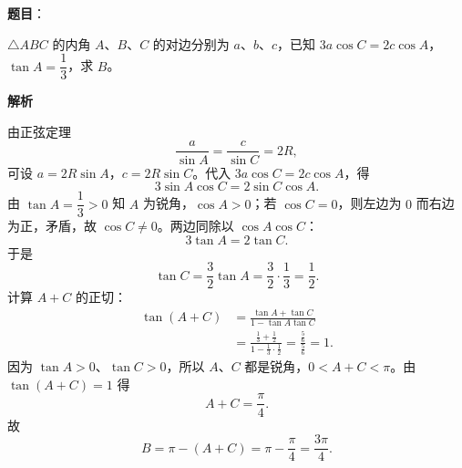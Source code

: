 \begin{answer}

\textbf{题目}：

$\triangle ABC$ 的内角 $A$、$B$、$C$ 的对边分别为 $a$、$b$、$c$，已知 $3a\cos C=2c\cos A$，$\tan A=\dfrac13$，求 $B$。

\textbf{解析}

由正弦定理
\nopagebreak[4]
\[\frac{a}{\sin A}=\frac{c}{\sin C}=2R,\]
可设 $a=2R\sin A$，$c=2R\sin C$。代入 $3a\cos C=2c\cos A$，得
\nopagebreak[4]
\[3\sin A\cos C=2\sin C\cos A.\]
由 $\tan A=\dfrac13>0$ 知 $A$ 为锐角，$\cos A>0$；若 $\cos C=0$，则左边为 $0$ 而右边为正，矛盾，故 $\cos C\neq0$。两边同除以 $\cos A\cos C$：
\nopagebreak[4]
\[3\tan A=2\tan C.\]
于是
\nopagebreak[4]
\[\tan C=\frac32\tan A=\frac32\cdot\frac13=\frac12.\]
计算 $A+C$ 的正切：
\nopagebreak[4]
\[\begin{aligned}
\tan(A+C)
&=\frac{\tan A+\tan C}{1-\tan A\tan C}\\
&=\frac{\frac13+\frac12}{1-\frac13\cdot\frac12}
=\frac{\frac56}{\frac56}=1.
\end{aligned}\]
因为 $\tan A>0$、$\tan C>0$，所以 $A$、$C$ 都是锐角，$0<A+C<\pi$。由 $\tan(A+C)=1$ 得
\nopagebreak[4]
\[A+C=\frac{\pi}{4}.\]
故
\nopagebreak[4]
\[B=\pi-(A+C)=\pi-\frac{\pi}{4}=\frac{3\pi}{4}.\]


\end{answer}
